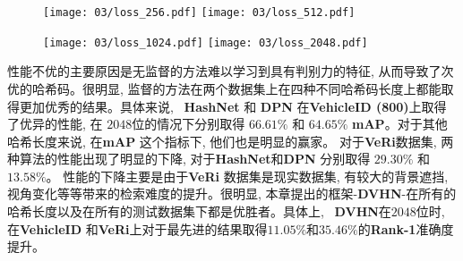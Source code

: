 \begin{figure}[!htp]
    \centering
    \texttt{[image: 03/loss\_256.pdf]}
    \hspace{1cm}
    \texttt{[image: 03/loss\_512.pdf]}
    \label{fig:losscurve}
  \end{figure}

  \begin{figure}[!htp]
    \centering
    \texttt{[image: 03/loss\_1024.pdf]}
    \hspace{1cm}
    \texttt{[image: 03/loss\_2048.pdf]}
    \label{fig:losscurve1}
  \end{figure}


性能不优的主要原因是无监督的方法难以学习到具有判别力的特征, 从而导致了次优的哈希码。很明显, 监督的方法在两个数据集上在四种不同哈希码长度上都能取得更加优秀的结果。具体来说, ~\textbf{HashNet} 和 \textbf{DPN} 在\textbf{VehicleID (800)}上取得了优异的性能, 在 $2048$位的情况下分别取得 $66.61 \%$ 和 $64.65 \%$ \textbf{mAP}。对于其他哈希长度来说, 在\textbf{mAP} 这个指标下, 他们也是明显的赢家。 对于\textbf{VeRi}数据集, 两种算法的性能出现了明显的下降, 对于\textbf{HashNet}和\textbf{DPN} 分别取得 $29.30\%$ 和$13.58\%$。 性能的下降主要是由于\textbf{VeRi} 数据集是现实数据集, 有较大的背景遮挡, 视角变化等等带来的检索难度的提升。很明显, 本章提出的框架-\textbf{DVHN}-在所有的哈希长度以及在所有的测试数据集下都是优胜者。具体上, ~\textbf{DVHN}在$2048$位时, 在\textbf{VehicleID} 和\textbf{VeRi}上对于最先进的结果取得$11.05\%$和$35.46 \%$的\textbf{Rank-1}准确度提升。




